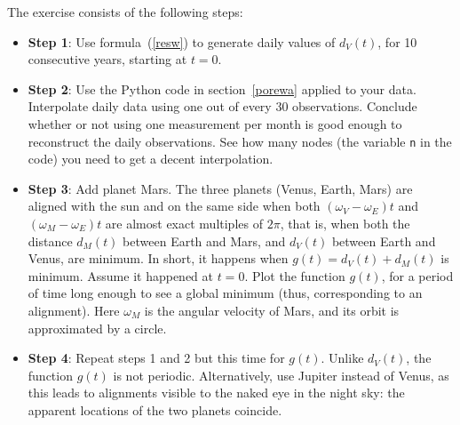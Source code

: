 \documentclass[oneside,10pt]{book}
\begin{document}
\begin{Exercise}
\noindent The exercise consists of the following steps:
\begin{itemize}
\item[] {\bf Step 1}:  Use formula~(\ref{resw}) to generate daily values of $d_V(t)$, for 10 consecutive years, starting at $t=0$.
\item[] {\bf Step 2}:  Use the Python code in section~\ref{porewa} applied to your data. Interpolate daily data using one out of every 30 observations. Conclude whether or not using one measurement per month is good enough to reconstruct the daily observations. See how many nodes (the variable \texttt{n} in the code) you need to get a decent interpolation.
\item[] {\bf Step 3}:  Add planet Mars. The three planets (Venus, Earth, Mars) are aligned with the sun and on the same side when both $(\omega_V-\omega_E)t$ and $(\omega_M-\omega_E)t$ are almost exact multiples of $2\pi$, that is, when both the distance $d_M(t)$ between Earth and Mars, and $d_V(t)$ between Earth and Venus, are minimum. In short, it happens when
$g(t) = d_V(t) + d_M(t)$ is minimum.  Assume it happened at $t=0$. Plot the function $g(t)$, for a period of time long enough to see a global minimum (thus, corresponding to an alignment). Here $\omega_M$ is the angular velocity of Mars, and its orbit is approximated by a circle.
\item[] {\bf Step 4}: Repeat steps 1 and 2 but this time for $g(t)$. Unlike $d_V(t)$, the function $g(t)$ is not periodic. Alternatively, use Jupiter instead of Venus, as this leads to alignments visible to the naked eye in the night sky: the apparent locations of the two planets coincide.


\end{itemize}
\end{Exercise}
\end{document}
